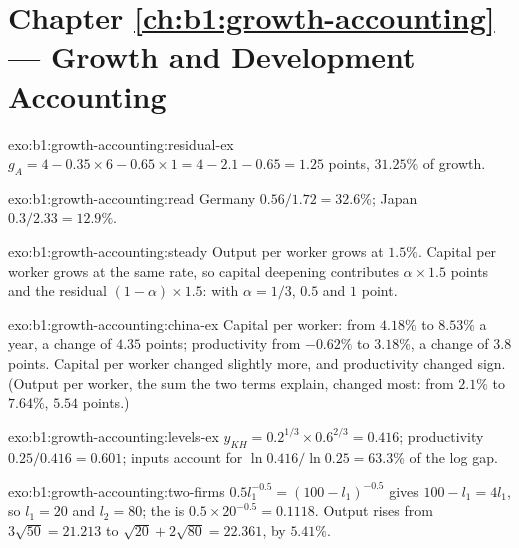 \section*{Chapter \ref{ch:b1:growth-accounting} --- Growth and Development Accounting}

\begin{solution}{exo:b1:growth-accounting:residual-ex}
$g_A = 4 - 0.35 \times 6 - 0.65 \times 1 = 4 - 2.1 - 0.65 = 1.25$ points, $31.25\%$ of growth.
\end{solution}

\begin{solution}{exo:b1:growth-accounting:read}
Germany $0.56/1.72 = 32.6\%$; Japan $0.3/2.33 = 12.9\%$.
\end{solution}

\begin{solution}{exo:b1:growth-accounting:steady}
Output per worker grows at $1.5\%$. Capital per worker grows at the same
rate, so capital deepening contributes $\alpha \times 1.5$ points and the residual
$(1 - \alpha) \times 1.5$: with $\alpha = 1/3$, $0.5$ and $1$ point.
\end{solution}

\begin{solution}{exo:b1:growth-accounting:china-ex}
Capital per worker: from $4.18\%$ to $8.53\%$ a year, a change of $4.35$
points; productivity from $-0.62\%$ to $3.18\%$, a change of $3.8$ points.
Capital per worker changed slightly more, and productivity changed sign.
(Output per worker, the sum the two terms explain, changed most: from
$2.1\%$ to $7.64\%$, $5.54$ points.)
\end{solution}

\begin{solution}{exo:b1:growth-accounting:levels-ex}
$y_{KH} = 0.2^{1/3} \times 0.6^{2/3} = 0.416$; productivity $0.25/0.416 = 0.601$; inputs account for
$\ln 0.416/\ln 0.25 = 63.3\%$ of the log gap.
\end{solution}

\begin{solution}{exo:b1:growth-accounting:two-firms}
$0.5l_1^{-0.5} = (100 - l_1)^{-0.5}$ gives $100 - l_1 = 4l_1$, so $l_1 = 20$ and $l_2 = 80$; the  is $0.5 \times 20^{-0.5} = 0.1118$. Output rises from $3\sqrt{50} = 21.213$ to
$\sqrt{20} + 2\sqrt{80} = 22.361$, by $5.41\%$.
\end{solution}

